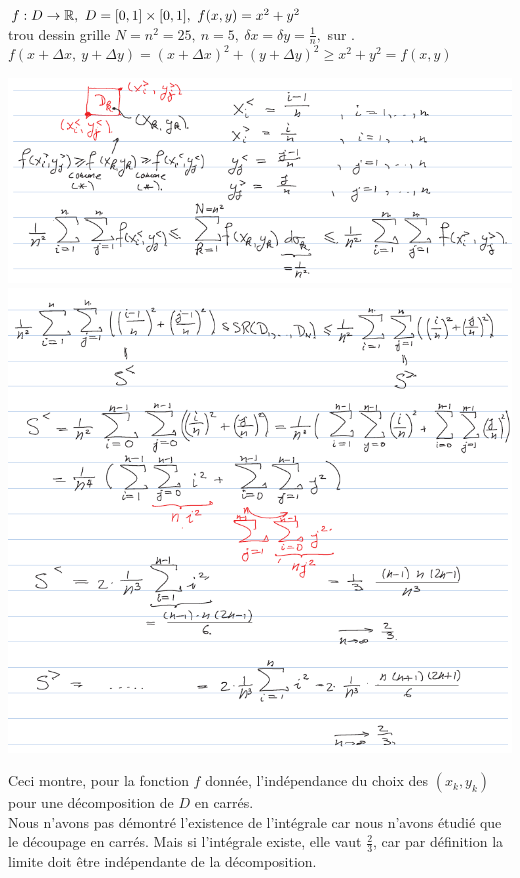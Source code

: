 \documentclass[12pt,a4paper]{article}
\begin{document}
 $f: D \to \R,\ D = [0,1] \times [0,1],\ f(x,y) = x^2 + y^2$\\
{trou dessin grille} $N = n^2 = 25,\ n=5,\ \delta x = \delta y = \frac{1}{n},$ sur .\\
$f(x+\Delta x,\ y+\Delta y) = (x+\Delta x)^2 + (y+\Delta y)^2 \geq x^2+y^2 = f(x,y)$
\begin{center}
\includegraphics[scale=0.7]{images/much_too_big1}\\
\includegraphics[scale=0.8]{images/much_too_big2}
\end{center}
 Ceci montre, pour la fonction $f$ donnée, l'indépendance du choix des $(x_k,y_k)$ pour une décomposition de $D$ en carrés.\\
 Nous n'avons pas démontré l'existence de l'intégrale car nous n'avons étudié que le découpage en carrés. Mais si l'intégrale existe, elle vaut $\frac{2}{3}$, car par définition la limite doit être indépendante de la décomposition.
\end{document}
